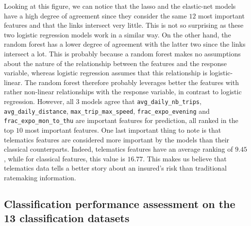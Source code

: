 \documentclass{article}
\begin{document}
Looking at this figure, we can notice that the lasso and the elastic-net models have a high degree of agreement since they consider the same $12$ most important features and that the links intersect very little. This is not so surprising as these two logistic regression models work in a similar way. On the other hand, the random forest has a lower degree of agreement with the latter two since the links intersect a lot. This is probably because a random forest makes no assumptions about the nature of the relationship between the features and the response variable, whereas logistic regression assumes that this relationship is logistic-linear. The random forest therefore probably leverages better the features with rather non-linear relationships with the response variable, in contrast to logistic regression. However, all $3$ models agree that \texttt{avg\_daily\_nb\_trips}, \texttt{avg\_daily\_distance}, \texttt{max\_trip\_max\_speed}, \texttt{frac\_expo\_evening} and \texttt{frac\_expo\_mon\_to\_thu} are important features for prediction, all ranked in the top $10$ most important features. One last important thing to note is that telematics features are considered more important by the models than their classical counterparts. Indeed, telematics features have an average ranking of $9.45$, while for classical features, this value is $16.77$. This makes us believe that telematics data tells a better story about an insured's risk than traditional ratemaking information.

\subsection{Classification performance assessment on the 13 classification datasets}
\end{document}
